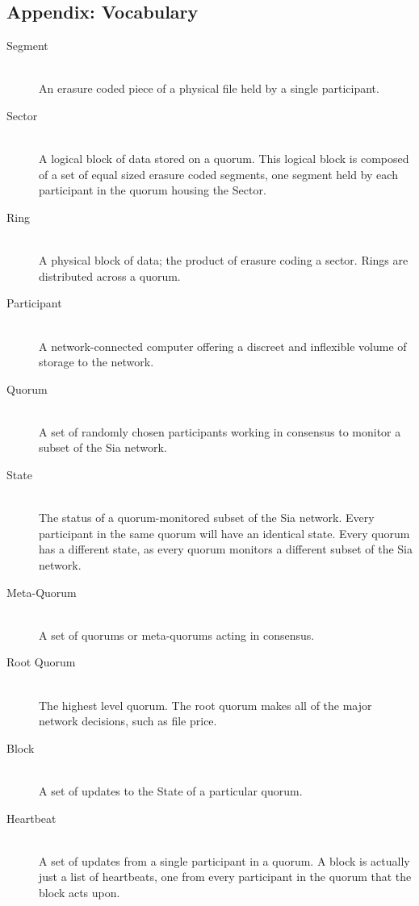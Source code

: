 \documentclass[twocolumn]{article}
\begin{document}
\subsection*{Appendix: Vocabulary}
\begin{description}
	\item[Segment] \hfill \\
	An erasure coded piece of a physical file held by a single participant.
	\item[Sector] \hfill \\
	A logical block of data stored on a quorum.
	This logical block is composed of a set of equal sized erasure coded segments, one segment held by each participant in the quorum housing the Sector.
	\item[Ring] \hfill \\
	A physical block of data; the product of erasure coding a sector.
	Rings are distributed across a quorum.
	
	\item[Participant] \hfill \\
	A network-connected computer offering a discreet and inflexible volume of storage to the network.
	\item[Quorum] \hfill \\
	A set of randomly chosen participants working in consensus to monitor a subset of the Sia network.
	\item[State] \hfill \\
	The status of a quorum-monitored subset of the Sia network.
	Every participant in the same quorum will have an identical state.
	Every quorum has a different state, as every quorum monitors a different subset of the Sia network.
	\item[Meta-Quorum] \hfill \\
	A set of quorums or meta-quorums acting in consensus.
	\item[Root Quorum] \hfill \\
	The highest level quorum.
	The root quorum makes all of the major network decisions, such as file price.

	\item[Block] \hfill \\
	A set of updates to the State of a particular quorum.
	\item[Heartbeat] \hfill \\
	A set of updates from a single participant in a quorum.
	A block is actually just a list of heartbeats, one from every participant in the quorum that the block acts upon.
\end{description}
\end{document}
